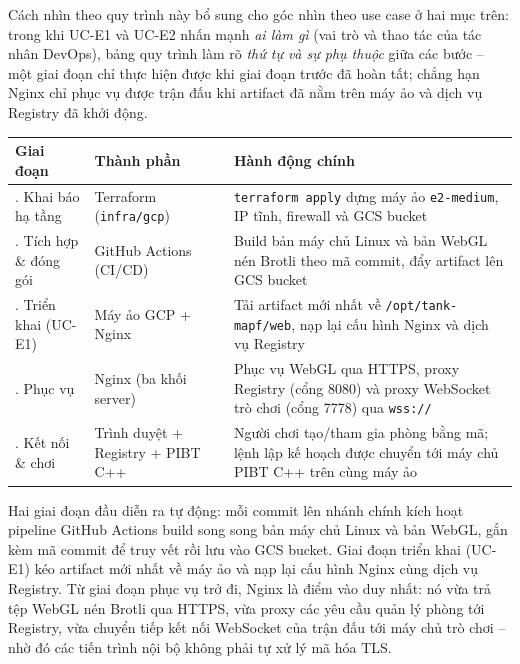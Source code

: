 \documentclass[../DoAn.tex]{subfiles}
\begin{document}
Cách nhìn theo quy trình này bổ sung cho góc nhìn theo use case ở hai mục trên: trong khi UC-E1
và UC-E2 nhấn mạnh \emph{ai làm gì} (vai trò và thao tác của tác nhân DevOps), bảng quy trình làm
rõ \emph{thứ tự và sự phụ thuộc} giữa các bước -- một giai đoạn chỉ thực hiện được khi giai đoạn
trước đã hoàn tất; chẳng hạn Nginx chỉ phục vụ được trận đấu khi artifact đã nằm trên máy ảo và
dịch vụ Registry đã khởi động.

\begin{center}
\begin{minipage}{\linewidth}
\centering
{}
\label{tab:deploy_pipeline}
\small
\begin{tabular}{|>{\raggedright\arraybackslash}p{2.5cm}|>{\raggedright\arraybackslash}p{3.1cm}|>{\raggedright\arraybackslash}p{6.3cm}|}
\hline
\textbf{Giai đoạn} & \textbf{Thành phần} & \textbf{Hành động chính} \\ \hline
1. Khai báo hạ tầng & Terraform (\texttt{infra/gcp}) & \texttt{terraform apply} dựng máy ảo \texttt{e2-medium}, IP tĩnh, firewall và GCS bucket \\
\hline
2. Tích hợp \& đóng gói & GitHub Actions (CI/CD) & Build bản máy chủ Linux và bản WebGL nén Brotli theo mã commit, đẩy artifact lên GCS bucket \\
\hline
3. Triển khai (UC-E1) & Máy ảo GCP + Nginx & Tải artifact mới nhất về \texttt{/opt/tank-mapf/web}, nạp lại cấu hình Nginx và dịch vụ Registry \\
\hline
4. Phục vụ & Nginx (ba khối server) & Phục vụ WebGL qua HTTPS, proxy Registry (cổng 8080) và proxy WebSocket trò chơi (cổng 7778) qua \texttt{wss://} \\
\hline
5. Kết nối \& chơi & Trình duyệt + Registry + PIBT C++ & Người chơi tạo/tham gia phòng bằng mã; lệnh lập kế hoạch được chuyển tới máy chủ PIBT C++ trên cùng máy ảo \\
\hline
\end{tabular}
\end{minipage}
\end{center}
\vspace{8pt}

Hai giai đoạn đầu diễn ra tự động: mỗi commit lên nhánh chính kích hoạt pipeline GitHub Actions
build song song bản máy chủ Linux và bản WebGL, gắn kèm mã commit để truy vết rồi lưu vào GCS
bucket. Giai đoạn triển khai (UC-E1) kéo artifact mới nhất về máy ảo và nạp lại cấu hình Nginx
cùng dịch vụ Registry. Từ giai đoạn phục vụ trở đi, Nginx là điểm vào duy nhất: nó vừa trả tệp
WebGL nén Brotli qua HTTPS, vừa proxy các yêu cầu quản lý phòng tới Registry, vừa chuyển tiếp kết
nối WebSocket của trận đấu tới máy chủ trò chơi -- nhờ đó các tiến trình nội bộ không phải tự xử
lý mã hóa TLS.
\end{document}
